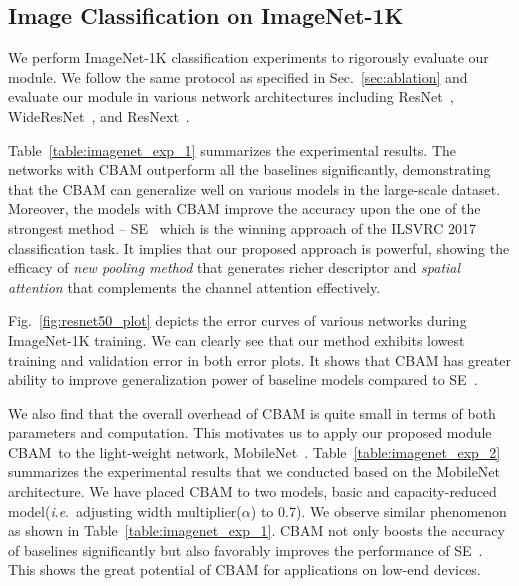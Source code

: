 \documentclass[runningheads]{llncs}
\newcommand{\ie}{\textit{i}.\textit{e}.}
\newcommand{\figref}[1]{Fig.~\ref{#1}}
\newcommand{\tabref}[1]{Table~\ref{#1}}
\newcommand{\sref}[1]{Sec.~\ref{#1}}
\newcommand*{\modulenameabb}{CBAM}
\begin{document}
\subsection{Image Classification on ImageNet-1K}



We perform ImageNet-1K classification experiments to rigorously evaluate our module. We follow the same protocol as specified in \sref{sec:ablation} 
and evaluate our module in various network architectures including ResNet~\cite{he2016deep}, WideResNet~\cite{zagoruyko2016wide}, and ResNext~\cite{xie2016aggregated}.

\tabref{table:imagenet_exp_1} summarizes the experimental results. The networks with CBAM outperform all the baselines significantly, demonstrating that the CBAM can generalize well on various models in the large-scale dataset. 
Moreover, the models with CBAM improve the accuracy upon the one of the strongest method -- SE~\cite{hu2017squeeze} which is the winning approach of the ILSVRC 2017 classification task. 
It implies that our proposed approach is powerful, showing the efficacy of \textit{new pooling method} that generates richer descriptor and \textit{spatial attention} that complements the channel attention effectively. 

\figref{fig:resnet50_plot} depicts the error curves of various networks during ImageNet-1K training. We can clearly see that our method exhibits lowest training and validation error in both error plots. It shows that CBAM has greater ability to improve generalization power of baseline models compared to SE~\cite{hu2017squeeze}.



We also find that the overall overhead of CBAM is quite small in terms of both parameters and computation. This motivates us to apply our proposed module \modulenameabb\ 
to the light-weight network, MobileNet~\cite{howard2017mobilenets}. 
\tabref{table:imagenet_exp_2} summarizes the experimental results that we conducted based on the MobileNet architecture. 
We have placed CBAM to two models, basic and capacity-reduced model(\ie\ adjusting width multiplier(\(\alpha\)) to 0.7). 
We observe similar phenomenon as shown in \tabref{table:imagenet_exp_1}. CBAM not only boosts the accuracy of baselines significantly but also favorably improves the performance of SE~\cite{hu2017squeeze}. This shows the great potential of CBAM for applications on low-end devices.
\end{document}
